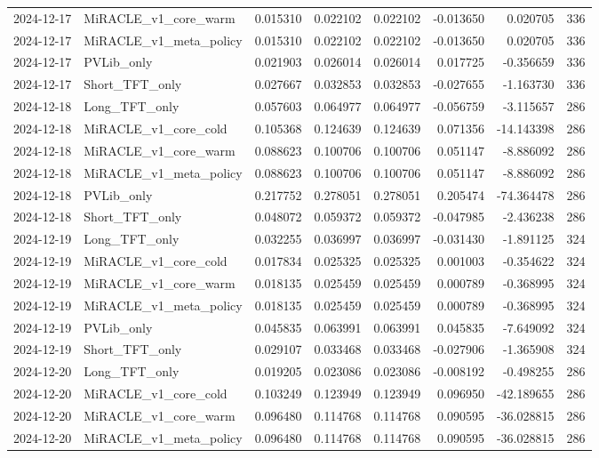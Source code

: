 \begin{tabular}{llrrrrrr}
2024-12-17 & MiRACLE_v1_core_warm & 0.015310 & 0.022102 & 0.022102 & -0.013650 & 0.020705 & 336 \\
2024-12-17 & MiRACLE_v1_meta_policy & 0.015310 & 0.022102 & 0.022102 & -0.013650 & 0.020705 & 336 \\
2024-12-17 & PVLib_only & 0.021903 & 0.026014 & 0.026014 & 0.017725 & -0.356659 & 336 \\
2024-12-17 & Short_TFT_only & 0.027667 & 0.032853 & 0.032853 & -0.027655 & -1.163730 & 336 \\
2024-12-18 & Long_TFT_only & 0.057603 & 0.064977 & 0.064977 & -0.056759 & -3.115657 & 286 \\
2024-12-18 & MiRACLE_v1_core_cold & 0.105368 & 0.124639 & 0.124639 & 0.071356 & -14.143398 & 286 \\
2024-12-18 & MiRACLE_v1_core_warm & 0.088623 & 0.100706 & 0.100706 & 0.051147 & -8.886092 & 286 \\
2024-12-18 & MiRACLE_v1_meta_policy & 0.088623 & 0.100706 & 0.100706 & 0.051147 & -8.886092 & 286 \\
2024-12-18 & PVLib_only & 0.217752 & 0.278051 & 0.278051 & 0.205474 & -74.364478 & 286 \\
2024-12-18 & Short_TFT_only & 0.048072 & 0.059372 & 0.059372 & -0.047985 & -2.436238 & 286 \\
2024-12-19 & Long_TFT_only & 0.032255 & 0.036997 & 0.036997 & -0.031430 & -1.891125 & 324 \\
2024-12-19 & MiRACLE_v1_core_cold & 0.017834 & 0.025325 & 0.025325 & 0.001003 & -0.354622 & 324 \\
2024-12-19 & MiRACLE_v1_core_warm & 0.018135 & 0.025459 & 0.025459 & 0.000789 & -0.368995 & 324 \\
2024-12-19 & MiRACLE_v1_meta_policy & 0.018135 & 0.025459 & 0.025459 & 0.000789 & -0.368995 & 324 \\
2024-12-19 & PVLib_only & 0.045835 & 0.063991 & 0.063991 & 0.045835 & -7.649092 & 324 \\
2024-12-19 & Short_TFT_only & 0.029107 & 0.033468 & 0.033468 & -0.027906 & -1.365908 & 324 \\
2024-12-20 & Long_TFT_only & 0.019205 & 0.023086 & 0.023086 & -0.008192 & -0.498255 & 286 \\
2024-12-20 & MiRACLE_v1_core_cold & 0.103249 & 0.123949 & 0.123949 & 0.096950 & -42.189655 & 286 \\
2024-12-20 & MiRACLE_v1_core_warm & 0.096480 & 0.114768 & 0.114768 & 0.090595 & -36.028815 & 286 \\
2024-12-20 & MiRACLE_v1_meta_policy & 0.096480 & 0.114768 & 0.114768 & 0.090595 & -36.028815 & 286 \\

\end{tabular}

